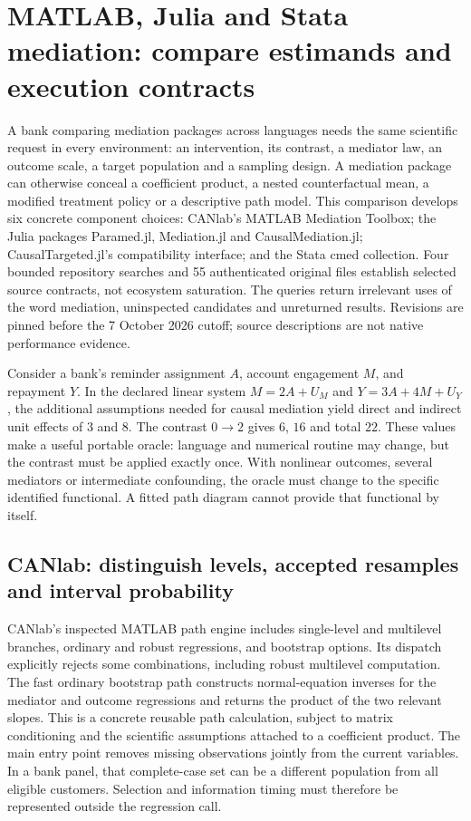 \section[Remaining-language mediation contracts]{MATLAB, Julia and Stata mediation: compare estimands and execution contracts}
\label{sec:exec25-omed}

A bank comparing mediation packages across languages needs the same scientific
request in every environment: an intervention, its contrast, a mediator law,
an outcome scale, a target population and a sampling design. A mediation
package can otherwise conceal a coefficient product, a nested counterfactual
mean, a modified treatment policy or a descriptive path model. This comparison
develops six concrete component choices: CANlab's MATLAB Mediation Toolbox;
the Julia packages Paramed.jl, Mediation.jl and CausalMediation.jl;
CausalTargeted.jl's compatibility interface; and the Stata cmed collection.
Four bounded repository searches and 55 authenticated original files establish
selected source contracts, not ecosystem saturation. The queries return
irrelevant uses of the word mediation, uninspected candidates and unreturned
results. Revisions are pinned before the 7 October 2026 cutoff; source
descriptions are not native performance evidence.\citep{exec25_omed_choice}

Consider a bank's reminder assignment $A$, account engagement $M$, and repayment
$Y$. In the declared linear system $M=2A+U_M$ and $Y=3A+4M+U_Y$, the additional
assumptions needed for causal mediation yield direct and indirect unit effects
of $3$ and $8$. The contrast $0\rightarrow2$ gives $6$, $16$ and total $22$.
These values make a useful portable oracle: language and numerical routine may
change, but the contrast must be applied exactly once. With nonlinear outcomes,
several mediators or intermediate confounding, the oracle must change to the
specific identified functional. A fitted path diagram cannot provide that
functional by itself.\citep{exec25_omed_choice}

\subsection{CANlab: distinguish levels, accepted resamples and interval probability}

CANlab's inspected MATLAB path engine includes single-level and multilevel
branches, ordinary and robust regressions, and bootstrap options. Its dispatch
explicitly rejects some combinations, including robust multilevel computation.
The fast ordinary bootstrap path constructs normal-equation inverses for the
mediator and outcome regressions and returns the product of the two relevant
slopes. This is a concrete reusable path calculation, subject to matrix
conditioning and the scientific assumptions attached to a coefficient product.
The main entry point removes missing observations jointly from the current
variables. In a bank panel, that complete-case set can be a different population
from all eligible customers. Selection and information timing must therefore
be represented outside the regression call.\citep{exec25_omed_canlab}

